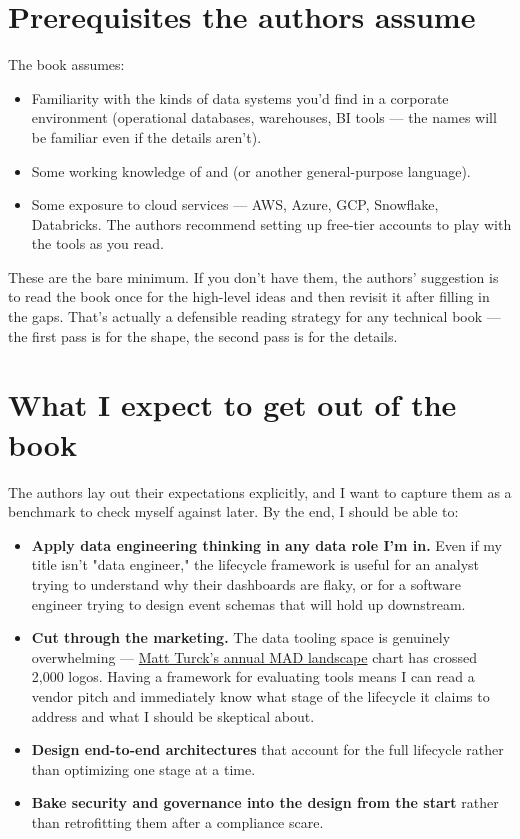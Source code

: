 \section*{Prerequisites the authors assume}

The book assumes:
\begin{itemize}[leftmargin=*]
  \item Familiarity with the kinds of data systems you'd find in a corporate environment (operational databases, warehouses, BI tools — the names will be familiar even if the details aren't).
  \item Some working knowledge of  and  (or another general-purpose language).
  \item Some exposure to cloud services — AWS, Azure, GCP, Snowflake, Databricks. The authors recommend setting up free-tier accounts to play with the tools as you read.
\end{itemize}

These are the bare minimum. If you don't have them, the authors' suggestion is to read the book once for the high-level ideas and then revisit it after filling in the gaps. That's actually a defensible reading strategy for any technical book — the first pass is for the shape, the second pass is for the details.

\section*{What I expect to get out of the book}

The authors lay out their expectations explicitly, and I want to capture them as a benchmark to check myself against later. By the end, I should be able to:

\begin{itemize}[leftmargin=*]
  \item \textbf{Apply data engineering thinking in any data role I'm in.} Even if my title isn't "data engineer," the lifecycle framework is useful for an analyst trying to understand why their dashboards are flaky, or for a software engineer trying to design event schemas that will hold up downstream.
  \item \textbf{Cut through the marketing.} The data tooling space is genuinely overwhelming — \href{https://mattturck.com/data2024/}{Matt Turck's annual MAD landscape} chart has crossed 2,000 logos. Having a framework for evaluating tools means I can read a vendor pitch and immediately know what stage of the lifecycle it claims to address and what I should be skeptical about.
  \item \textbf{Design end-to-end architectures} that account for the full lifecycle rather than optimizing one stage at a time.
  \item \textbf{Bake security and governance into the design from the start} rather than retrofitting them after a compliance scare.
\end{itemize}

